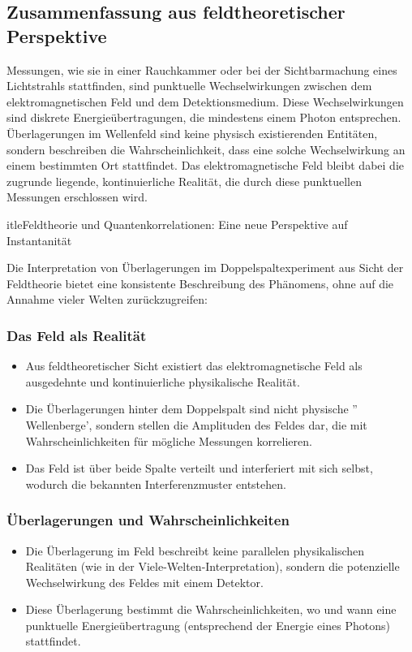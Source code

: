\documentclass[12pt,a4paper]{article}
\begin{document}
	\subsection{Zusammenfassung aus feldtheoretischer Perspektive}
	Messungen, wie sie in einer Rauchkammer oder bei der Sichtbarmachung eines Lichtstrahls stattfinden, sind punktuelle Wechselwirkungen zwischen dem elektromagnetischen Feld und dem Detektionsmedium. Diese Wechselwirkungen sind diskrete Energieübertragungen, die mindestens einem Photon entsprechen. Überlagerungen im Wellenfeld sind keine physisch existierenden Entitäten, sondern beschreiben die Wahrscheinlichkeit, dass eine solche Wechselwirkung an einem bestimmten Ort stattfindet. Das elektromagnetische Feld bleibt dabei die zugrunde liegende, kontinuierliche Realität, die durch diese punktuellen Messungen erschlossen wird.
	
	
	
		itle{Feldtheorie und Quantenkorrelationen: Eine neue Perspektive auf Instantanität}
	
	
	\maketitle
	
	Die Interpretation von Überlagerungen im Doppelspaltexperiment aus Sicht der Feldtheorie bietet eine konsistente Beschreibung des Phänomens, ohne auf die Annahme vieler Welten zurückzugreifen:
	
	\subsubsection{Das Feld als Realität}
	\begin{itemize}
		\item Aus feldtheoretischer Sicht existiert das elektromagnetische Feld als ausgedehnte und kontinuierliche physikalische Realität.
		\item Die Überlagerungen hinter dem Doppelspalt sind nicht physische '' Wellenberge', sondern stellen die Amplituden des Feldes dar, die mit Wahrscheinlichkeiten für mögliche Messungen korrelieren.
		\item Das Feld ist über beide Spalte verteilt und interferiert mit sich selbst, wodurch die bekannten Interferenzmuster entstehen.
	\end{itemize}
	
	\subsubsection{Überlagerungen und Wahrscheinlichkeiten}
	\begin{itemize}
		\item Die Überlagerung im Feld beschreibt keine parallelen physikalischen Realitäten (wie in der Viele-Welten-Interpretation), sondern die potenzielle Wechselwirkung des Feldes mit einem Detektor.
		\item Diese Überlagerung bestimmt die Wahrscheinlichkeiten, wo und wann eine punktuelle Energieübertragung (entsprechend der Energie eines Photons) stattfindet.
	\end{itemize}
	
\end{document}
